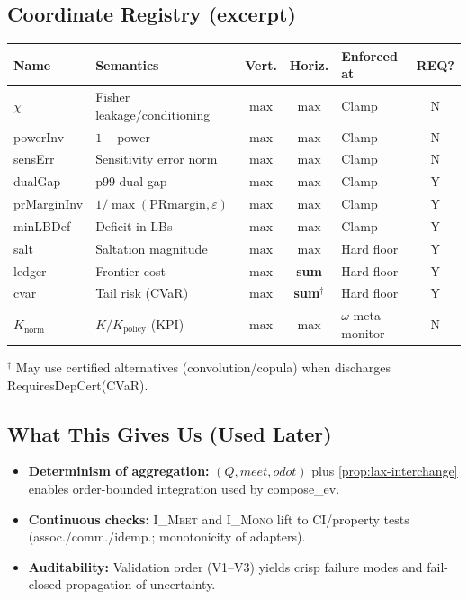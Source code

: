 \documentclass[11pt]{article}
\theoremstyle{plain}
\theoremstyle{definition}
\theoremstyle{remark}
\def\Q{Q}%
\def\Sig{\Sigma}%
\def\composeev{compose\_ev}%
\def\vmeet{meet}%
\def\hplus{odot}%
\def\code#1{#1}%
\DeclareRobustCommand{\Q}{\texorpdfstring{\ensuremath{\mathcal{Q}}}{Q}}     %
\DeclareRobustCommand{\Sig}{\texorpdfstring{\ensuremath{\Sigma}}{\Sigma}}   %
\DeclareMathOperator{\composeevOp}{compose\_ev}
\DeclareRobustCommand{\composeev}{\texorpdfstring{\ensuremath{\composeevOp}}{compose\_ev}}
\newcommand{\vmeet}{\wedge}                    %
\newcommand{\hplus}{\odot}                     %
\newcommand{\code}[1]{\texttt{\textup{#1}}}    %
\newcommand{\powerInv}{\code{powerInv}}
\newcommand{\prMarginInv}{\code{prMarginInv}}
\newcommand{\minLBDef}{\code{minLBDef}}
\newcommand{\dualGap}{\code{dualGap}}
\newcommand{\sensErr}{\code{sensErr}}
\newcommand{\ledger}{\code{ledger}}
\newcommand{\cvar}{\code{cvar}}
\newcommand{\knorm}{\ensuremath{K_{\mathrm{norm}}}}
\newcommand{\om}{\ensuremath{\omega}}
\newcommand{\IMeet}{\textsc{I\_Meet}}
\newcommand{\IMono}{\textsc{I\_Mono}}
\def\Q{Q}%
\def\Sig{\Sigma}%
\def\composeev{compose\_ev}%
\def\vmeet{meet}%
\def\hplus{odot}%
\def\code#1{#1}%
\begin{document}
\subsection{Coordinate Registry (excerpt)}
\begin{center}
\renewcommand{\arraystretch}{1.15}
\begin{tabularx}{\linewidth}{@{}l l c c l c@{}}
\toprule
\textbf{Name} & \textbf{Semantics} & \textbf{Vert.} & \textbf{Horiz.} & \textbf{Enforced at} & \textbf{REQ?}\\
\midrule
$\chi$ & Fisher leakage/conditioning & $\max$ & $\max$ & Clamp & N \\
\powerInv & $1-\mathrm{power}$ & $\max$ & $\max$ & Clamp & N \\
\sensErr & Sensitivity error norm & $\max$ & $\max$ & Clamp & N \\
\dualGap & p99 dual gap & $\max$ & $\max$ & Clamp & Y \\
\prMarginInv & $1/\max(\mathrm{PRmargin},\varepsilon)$ & $\max$ & $\max$ & Clamp & Y \\
\minLBDef & Deficit in LBs & $\max$ & $\max$ & Clamp & Y \\
\code{salt} & Saltation magnitude & $\max$ & $\max$ & Hard floor & Y \\
\ledger & Frontier cost & $\max$ & \textbf{sum} & Hard floor & Y \\
\cvar & Tail risk (CVaR) & $\max$ & \textbf{sum}$^\dagger$ & Hard floor & Y \\
$\knorm$ & $K/K_{\mathrm{policy}}$ (KPI) & $\max$ & $\max$ & $\om$ meta-monitor & N \\
\bottomrule
\end{tabularx}

\vspace{0.25em}
\footnotesize $^\dagger$ May use certified alternatives (convolution/copula) when \Sig{} discharges \code{RequiresDepCert(CVaR)}.
\end{center}

\subsection{What This Gives Us (Used Later)}
\begin{itemize}
  \item \textbf{Determinism of aggregation:} $(\Q,\vmeet,\hplus)$ plus \cref{prop:lax-interchange} enables order-bounded integration used by \composeev.
  \item \textbf{Continuous checks:} \IMeet{} and \IMono{} lift to CI/property tests (assoc./comm./idemp.; monotonicity of adapters).
  \item \textbf{Auditability:} Validation order (V1–V3) yields crisp failure modes and fail-closed propagation of uncertainty.
\end{itemize}
\end{document}
